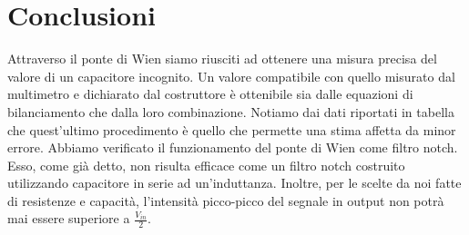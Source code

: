 \section{Conclusioni}

Attraverso il ponte di Wien siamo riusciti ad ottenere una misura precisa del valore di un capacitore incognito. Un valore compatibile con quello misurato dal multimetro e dichiarato dal costruttore è ottenibile sia dalle equazioni di bilanciamento che dalla loro combinazione. Notiamo dai dati riportati in tabella che quest'ultimo procedimento è quello che permette una stima affetta da minor errore. 
Abbiamo verificato il funzionamento del ponte di Wien come filtro notch. Esso, come già detto, non risulta efficace come un filtro notch costruito utilizzando capacitore in serie ad un'induttanza. Inoltre, per le scelte da noi fatte di resistenze e capacità, l'intensità picco-picco del segnale in output non potrà mai essere superiore a $\frac{V_{in}}{2}$. 